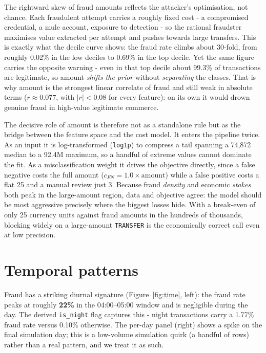 \documentclass[11pt,a4paper]{report}
\newcommand{\code}[1]{\texttt{\small #1}}
\begin{document}
The rightward skew of fraud amounts reflects the attacker's optimisation, not chance. Each fraudulent attempt carries a roughly fixed cost - a compromised credential, a mule account, exposure to detection - so the rational fraudster maximises value extracted per attempt and pushes towards large transfers. This is exactly what the decile curve shows: the fraud rate climbs about 30-fold, from roughly 0.02\% in the low deciles to 0.69\% in the top decile. Yet the same figure carries the opposite warning - even in that top decile about 99.3\% of transactions are legitimate, so amount \emph{shifts the prior} without \emph{separating} the classes. That is why amount is the strongest linear correlate of fraud and still weak in absolute terms ($r \approx 0.077$, with $|r| < 0.08$ for every feature): on its own it would drown genuine fraud in high-value legitimate commerce.

The decisive role of amount is therefore not as a standalone rule but as the bridge between the feature space and the cost model. It enters the pipeline twice. As an input it is log-transformed (\code{log1p}) to compress a tail spanning a 74{,}872 median to a 92.4M maximum, so a handful of extreme values cannot dominate the fit. As a misclassification weight it drives the objective directly, since a false negative costs the full amount ($c_{FN} = 1.0 \times \text{amount}$) while a false positive costs a flat 25 and a manual review just 3. Because fraud \emph{density} and economic \emph{stakes} both peak in the large-amount region, data and objective agree: the model should be most aggressive precisely where the biggest losses hide. With a break-even of only 25 currency units against fraud amounts in the hundreds of thousands, blocking widely on a large-amount \code{TRANSFER} is the economically correct call even at low precision.

\section{Temporal patterns}

Fraud has a striking diurnal signature (Figure~\ref{fig:time}, left): the fraud rate peaks
at roughly \textbf{22\%} in the 04:00–05:00 window and is negligible during the day. The derived
\code{is\_night} flag captures this - night transactions carry a 1.77\% fraud rate versus
0.10\% otherwise. The per-day panel (right) shows a spike on the final simulation day; this
is a low-volume simulation quirk (a handful of rows) rather than a real pattern, and we
treat it as such.
\end{document}
